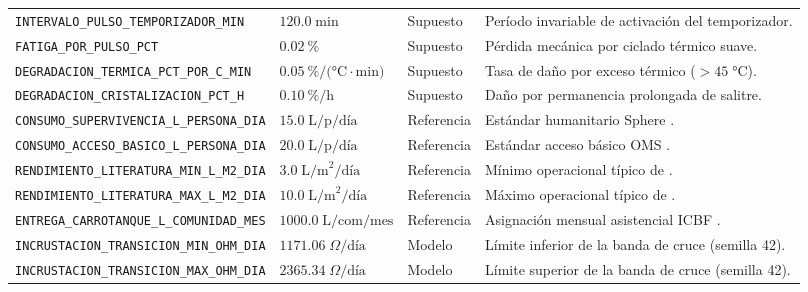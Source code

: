 {\begin{longtable}{@{}L{4.7cm}L{2.7cm}L{2.0cm}L{5.3cm}@{}}
\texttt{INTERVALO\_PULSO\_\allowbreak TEMPORIZADOR\_MIN}& $120.0\;\text{min}$ & Supuesto & Per\'iodo invariable de activaci\'on del temporizador. \\
\texttt{FATIGA\_POR\_PULSO\_PCT} & $\SI{0.02}{\percent}$ & Supuesto & P\'erdida mec\'anica por ciclado t\'ermico suave. \\
\texttt{DEGRADACION\_TERMICA\_\allowbreak PCT\_POR\_C\_MIN} & $\SI{0.05}{\percent\per(\celsius\cdot\minute)}$ & Supuesto & Tasa de da\~no por exceso t\'ermico ($>45\;\si{\celsius}$). \\
\texttt{DEGRADACION\_\allowbreak CRISTALIZACION\_PCT\_H}& $\SI{0.10}{\percent\per\hour}$ & Supuesto & Da\~no por permanencia prolongada de salitre. \\
\texttt{CONSUMO\_SUPERVIVENCIA\_\allowbreak L\_PERSONA\_DIA} & $15.0\;\text{L/p/d\'ia}$ & Referencia & Est\'andar humanitario Sphere \parencite{sphere2018handbook}. \\
\texttt{CONSUMO\_ACCESO\_BASICO\_\allowbreak L\_PERSONA\_DIA} & $20.0\;\text{L/p/d\'ia}$ & Referencia & Est\'andar acceso b\'asico OMS \parencite{howard2020domestic}. \\
\texttt{RENDIMIENTO\_LITERATURA\_\allowbreak MIN\_L\_M2\_DIA} & $3.0\;\text{L/m}^2\text{/d\'ia}$ & Referencia & M\'inimo operacional t\'ipico de \textcite{klemm2012fog}. \\
\texttt{RENDIMIENTO\_LITERATURA\_\allowbreak MAX\_L\_M2\_DIA} & $10.0\;\text{L/m}^2\text{/d\'ia}$ & Referencia & M\'aximo operacional t\'ipico de \textcite{klemm2012fog}. \\
\texttt{ENTREGA\_CARROTANQUE\_\allowbreak L\_COMUNIDAD\_MES} & $1000.0\;\text{L/com/mes}$ & Referencia & Asignaci\'on mensual asistencial ICBF \parencite{icbf2025agua}. \\
\texttt{INCRUSTACION\_TRANSICION\_\allowbreak MIN\_OHM\_DIA} & $1171.06\;\Omega\text{/d\'ia}$ & Modelo & L\'imite inferior de la banda de cruce (semilla 42). \\
\texttt{INCRUSTACION\_TRANSICION\_\allowbreak MAX\_OHM\_DIA} & $2365.34\;\Omega\text{/d\'ia}$ & Modelo & L\'imite superior de la banda de cruce (semilla 42). \\
\end{longtable}
}

